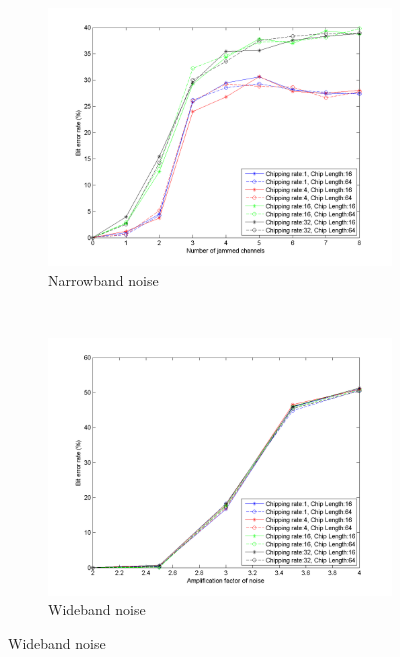 		\begin{figure}[H]
			\centering
			\begin{subfigure}[b]{0.5\textwidth}
				\includegraphics[width=\textwidth]{imgs/results/plot_mode_fhss-test_narrowband-rep_20-dataRate_8-dataLength_128.png}
				\caption{Narrowband noise}
				\label{fig:fhss_narrowband}
			\end{subfigure}%
			~
			\begin{subfigure}[b]{0.5\textwidth}
				\includegraphics[width=\textwidth]{imgs/results/plot_mode_fhss-test_wideband-rep_20-dataRate_8-dataLength_128.png}
				\caption{Wideband noise}
				\label{fig:fhss_wideband}
			\end{subfigure}
		\end{figure}
		
